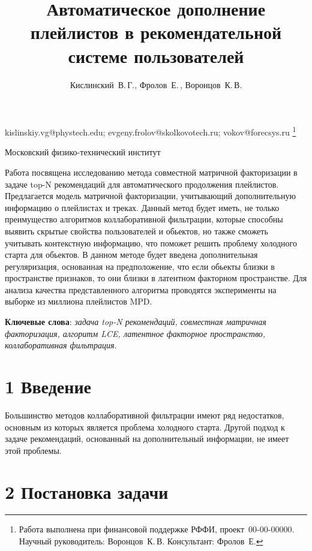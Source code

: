 \documentclass[12pt,twoside]{article}
\begin{document}
\title
    {Автоматическое дополнение плейлистов в рекомендательной системе пользователей}
\author
    {Кислинский~В.\,Г., Фролов~Е.\,, Воронцов~К.\,В.} %
\email
    {kislinskiy.vg@phystech.edu; evgeny.frolov@skolkovotech.ru; vokov@forecsys.ru}
\thanks
    {Работа выполнена при финансовой поддержке РФФИ, проект \No\,00-00-00000.
     Научный руководитель:  Воронцов~К.\,В.
     Консультант:  Фролов~Е.}

\organization
    {Московский физико-технический институт}
\abstract
	{Работа посвящена исследованию метода совместной матричной факторизации в задаче top-N рекомендаций для автоматического продолжения плейлистов. Предлагается  модель матричной факторизации, учитывающий дополнительную информацию о плейлистах и треках. Данный метод будет иметь, не только преимущество алгоритмов коллаборативной фильтрации, которые способны выявить скрытые свойства пользователей и обьектов,  но также сможеть учитывать контекстную информацию, что поможет решить проблему холодного старта для обьектов. В данном методе будет введена дополнительная регуляризация, основанная на предположение, что если обьекты близки в пространстве признаков, то они близки в латентном факторном пространстве. Для анализа качества представленного алгоритма проводятся эксперименты на выборке  из миллиона плейлистов MPD. 

\bigskip
\textbf{Ключевые слова}: \emph {задача top-N рекомендаций, совместная матричная факторизация, алгоритм LCE, латентное факторное пространство, коллаборативная фильтрация}.

}

\maketitle

\section{1 Введение}

Большинство методов коллаборативной фильтрации имеют ряд недостатков, основным из которых является проблема холодного старта. Другой подход к задаче рекомендаций, основанный на дополнительный информации, не имеет этой проблемы. 

\section{2 Постановка задачи}
\end{document}
